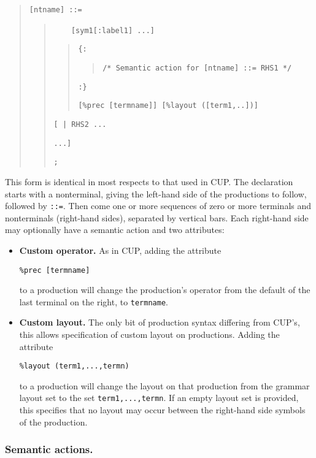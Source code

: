 \documentclass[12pt,english,twoside]{report}
\begin{document}
\begin{quote}
\texttt{{[}ntname] ::=}
\begin{quote}
~~\texttt{~~{[}sym1{[}:label1] ...]}
\begin{quote}
\texttt{\{:}
\begin{quote}
\texttt{/{*} Semantic action for {[}ntname] ::= RHS1 {*}/}
\end{quote}
\texttt{:\}}

\texttt{{[}\%prec {[}termname]] {[}\%layout ({[}term1,..])]}
\end{quote}
\texttt{{[} | RHS2 ...}

\texttt{...]}

\texttt{;}
\end{quote}
\end{quote}
This form is identical in most respects to that used in CUP. The declaration
starts with a nonterminal, giving the left-hand side of the productions
to follow, followed by \texttt{::=}. Then come one or more sequences
of zero or more terminals and nonterminals (right-hand sides), separated
by vertical bars. Each right-hand side may optionally have a semantic
action and two attributes:

\begin{itemize}
\item \textbf{Custom operator.} As in CUP, adding the attribute


\texttt{\%prec {[}termname]}

to a production will change the production's operator from the default
of the last terminal on the right, to \texttt{termname}.

\item \textbf{Custom layout.} The only bit of production syntax differing
from CUP's, this allows specification of custom layout on productions.
Adding the attribute


\texttt{\%layout (term1,...,termn)}

to a production will change the layout on that production from the
grammar layout set to the set \texttt{term1,...,termn}. If an empty
layout set is provided, this specifies that no layout may occur
between the right-hand side symbols of the production.

\end{itemize}

\subsubsection{Semantic actions.}
\end{document}
